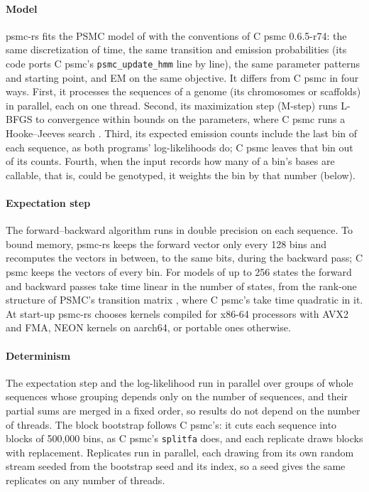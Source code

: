 \documentclass[a4paper,num-refs,gigabyte]{oup-contemporary}%
\newcommand{\psmcrs}{psmc-rs}
\begin{document}
\paragraph{Model} \psmcrs{} fits the PSMC model of \citet{li2011} with the conventions of C psmc 0.6.5-r74: the same discretization of time, the same transition and emission probabilities (its code ports C psmc's \texttt{psmc\_update\_hmm} line by line), the same parameter patterns and starting point, and EM on the same objective. It differs from C psmc in four ways. First, it processes the sequences of a genome (its chromosomes or scaffolds) in parallel, each on one thread. Second, its maximization step (M-step) runs L-BFGS \citep{liu1989} to convergence within bounds on the parameters, where C psmc runs a Hooke--Jeeves search \citep{hooke1961}. Third, its expected emission counts include the last bin of each sequence, as both programs' log-likelihoods do; C psmc leaves that bin out of its counts. Fourth, when the input records how many of a bin's bases are callable, that is, could be genotyped, it weights the bin by that number (below).

\paragraph{Expectation step} The forward--backward algorithm runs in double precision on each sequence. To bound memory, \psmcrs{} keeps the forward vector only every 128 bins and recomputes the vectors in between, to the same bits, during the backward pass; C psmc keeps the vectors of every bin. For models of up to 256 states the forward and backward passes take time linear in the number of states, from the rank-one structure of PSMC's transition matrix \citep{harris2014}, where C psmc's take time quadratic in it. At start-up \psmcrs{} chooses kernels compiled for x86-64 processors with AVX2 and FMA, NEON kernels on aarch64, or portable ones otherwise.

\paragraph{Determinism} The expectation step and the log-likelihood run in parallel over groups of whole sequences whose grouping depends only on the number of sequences, and their partial sums are merged in a fixed order, so results do not depend on the number of threads. The block bootstrap \citep{kunsch1989} follows C psmc's: it cuts each sequence into blocks of 500,000 bins, as C psmc's \texttt{splitfa} does, and each replicate draws blocks with replacement. Replicates run in parallel, each drawing from its own random stream seeded from the bootstrap seed and its index, so a seed gives the same replicates on any number of threads.
\end{document}

